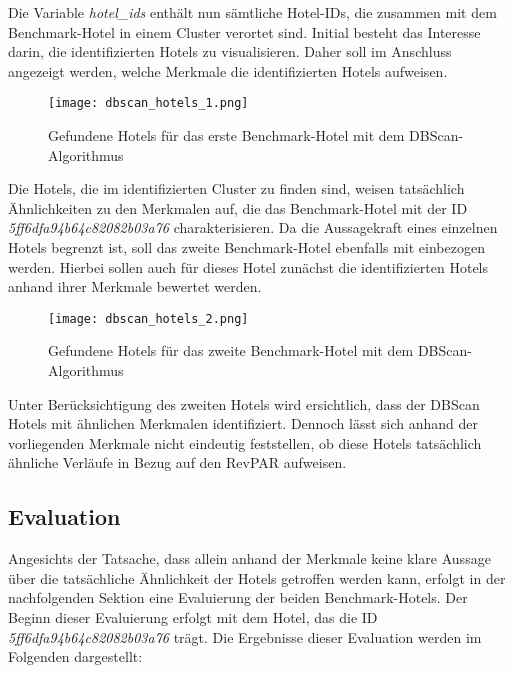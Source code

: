 Die Variable \emph{hotel\_ids} enthält nun sämtliche Hotel-IDs, die zusammen mit dem Benchmark-Hotel in einem Cluster verortet sind. Initial besteht das Interesse darin, die identifizierten Hotels zu visualisieren. Daher soll im Anschluss angezeigt werden, welche Merkmale die identifizierten Hotels aufweisen.

\begin{figure}[h]
    \centering
    \texttt{[image: dbscan\_hotels\_1.png]}
    \caption[Gefundene Hotels für das erste Benchmark-Hotel mit dem DBScan-Algorithmus]{Gefundene Hotels für das erste Benchmark-Hotel mit dem DBScan-Algorithmus}
    \label{img:dbscan_hotels_1}
\end{figure}

Die Hotels, die im identifizierten Cluster zu finden sind, weisen tatsächlich Ähnlichkeiten zu den Merkmalen auf, die das Benchmark-Hotel mit der ID \emph{5ff6dfa94b64c82082b03a76} charakterisieren. Da die Aussagekraft eines einzelnen Hotels begrenzt ist, soll das zweite Benchmark-Hotel ebenfalls mit einbezogen werden. Hierbei sollen auch für dieses Hotel zunächst die identifizierten Hotels anhand ihrer Merkmale bewertet werden.

\begin{figure}[h]
    \centering
    \texttt{[image: dbscan\_hotels\_2.png]}
    \caption[Gefundene Hotels für das zweite Benchmark-Hotel mit dem DBScan-Algorithmus]{Gefundene Hotels für das zweite Benchmark-Hotel mit dem DBScan-Algorithmus}
    \label{img:dbscan_hotels_2}
\end{figure}

Unter Berücksichtigung des zweiten Hotels wird ersichtlich, dass der DBScan Hotels mit ähnlichen Merkmalen identifiziert. Dennoch lässt sich anhand der vorliegenden Merkmale nicht eindeutig feststellen, ob diese Hotels tatsächlich ähnliche Verläufe in Bezug auf den RevPAR aufweisen.

\subsection{Evaluation}
Angesichts der Tatsache, dass allein anhand der Merkmale keine klare Aussage über die tatsächliche Ähnlichkeit der Hotels getroffen werden kann, erfolgt in der nachfolgenden Sektion eine Evaluierung der beiden Benchmark-Hotels. 
\newline
\newline
Der Beginn dieser Evaluierung erfolgt mit dem Hotel, das die ID \emph{5ff6dfa94b64c82082b03a76} trägt. Die Ergebnisse dieser Evaluation werden im Folgenden dargestellt:

